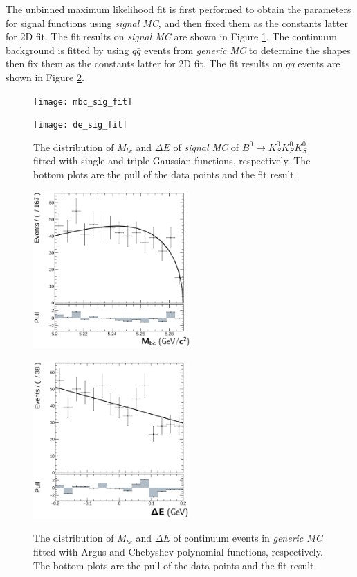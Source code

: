 The unbinned maximum likelihood fit is first performed to obtain the parameters for signal functions using \textit{signal MC}, and then fixed them as the constants latter for 2D fit. The fit results on \textit{signal MC} are shown in Figure \ref{fig:mbcde1D}. The continuum background is fitted by using $q\bar{q}$ events from \textit{generic MC} to determine the shapes then fix them as the constants latter for 2D fit. The fit results on \textit{$q\bar{q}$} events are shown in Figure \ref{fig:bkgmbcde}.
 \begin{figure}[htbp]
 	\begin{minipage}[b]{0.5\linewidth}
 		\centering 
 		\texttt{[image: mbc\_sig\_fit]}
 	\end{minipage}
 	\begin{minipage}[b]{0.5\linewidth}
 		\centering 
 		\texttt{[image: de\_sig\_fit]}
 	\end{minipage}
 	\caption{The distribution of $M_{bc}$ and $\Delta E$ of \textit{signal MC} of $B^0 \to K_S^0  K_S^0  K_S^0$ fitted with single and triple Gaussian functions, respectively. The bottom plots are the pull of the data points and the fit result.}
 	\label{fig:mbcde1D}
 \end{figure}
\begin{figure}[htbp]
	\begin{minipage}[b]{0.5\linewidth}
		\centering 
		\includegraphics[height=6cm]{figures/mbc_cs_fit}
		\label{}
	\end{minipage}
	\begin{minipage}[b]{0.5\linewidth}
		\centering 
		\includegraphics[height=6cm]{figures/de_cs_fit}
		\label{}
	\end{minipage}
	\caption{The distribution of $M_{bc}$ and $\Delta E$ of continuum events in \textit{generic MC} fitted with Argus and Chebyshev polynomial functions, respectively.  The bottom plots are the pull of the data points and the fit result.}
	\label{fig:bkgmbcde}
\end{figure}

